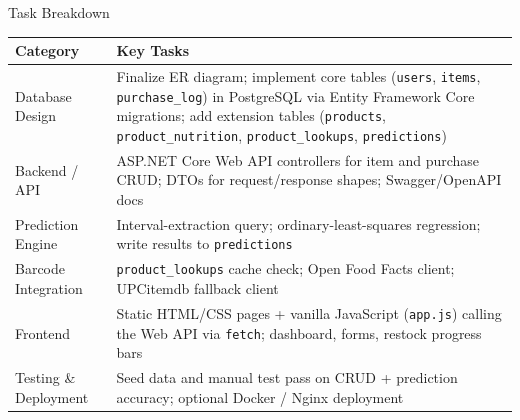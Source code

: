 \documentclass[aspectratio=169]{beamer}
\begin{document}
\begin{frame}{Task Breakdown}
  \small
  \begin{tabularx}{\linewidth}{>{\raggedright\arraybackslash}p{3.1cm} X}
    \toprule
    \textbf{Category} & \textbf{Key Tasks} \\
    \midrule
    Database Design &
      Finalize ER diagram; implement core tables (\texttt{users}, \texttt{items}, \texttt{purchase\_log}) in PostgreSQL via Entity Framework Core migrations; add extension tables (\texttt{products}, \texttt{product\_nutrition}, \texttt{product\_lookups}, \texttt{predictions}) \\[4pt]
    Backend / API &
      ASP.NET Core Web API controllers for item and purchase CRUD; DTOs for request/response shapes; Swagger/OpenAPI docs \\[4pt]
    Prediction Engine &
      Interval-extraction query; ordinary-least-squares regression; write results to \texttt{predictions} \\[4pt]
    Barcode Integration &
      \texttt{product\_lookups} cache check; Open Food Facts client; UPCitemdb fallback client \\[4pt]
    Frontend &
      Static HTML/CSS pages + vanilla JavaScript (\texttt{app.js}) calling the Web API via \texttt{fetch}; dashboard, forms, restock progress bars \\[4pt]
    Testing \& Deployment &
      Seed data and manual test pass on CRUD + prediction accuracy; optional Docker / Nginx deployment \\
    \bottomrule
  \end{tabularx}
\end{frame}
\end{document}
